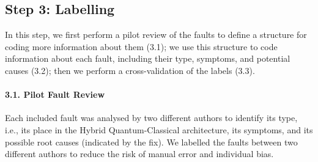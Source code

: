         




\subsection*{Step 3: Labelling}
In this step, we first perform a pilot review of the faults to define a structure for coding more information about them (3.1); we use this structure to code information about each fault, including their type, symptoms, and potential causes   (3.2); then we perform a cross-validation of the labels (3.3). 



\paragraph*{3.1. Pilot Fault Review}
Each included fault was analysed by two different authors to identify its type, i.e., its place in the Hybrid Quantum-Classical architecture, its symptoms, and its possible root causes (indicated by the fix). We labelled the faults between two different authors to reduce the risk of manual error and individual bias.

